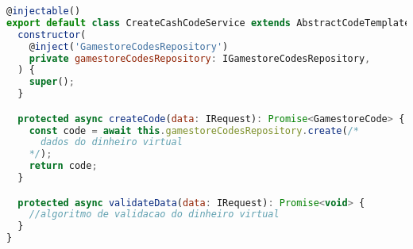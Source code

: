 \begin{lstlisting}[language=JavaScript, caption={Cadastro de Códigos para Dinheiro Virtual},captionpos=b, label=alg:cashcodeservice]
@injectable()
export default class CreateCashCodeService extends AbstractCodeTemplate {
  constructor(
    @inject('GamestoreCodesRepository')
    private gamestoreCodesRepository: IGamestoreCodesRepository,
  ) {
    super();
  }

  protected async createCode(data: IRequest): Promise<GamestoreCode> {
    const code = await this.gamestoreCodesRepository.create(/*
      dados do dinheiro virtual
    */);
    return code;
  }

  protected async validateData(data: IRequest): Promise<void> {
    //algoritmo de validacao do dinheiro virtual
  }
}
\end{lstlisting}
